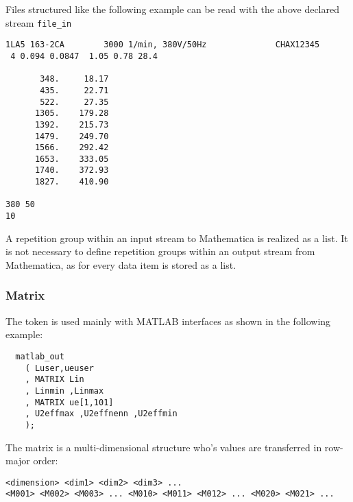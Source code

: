 Files structured like the following example can be read
with the above declared stream \verb+file_in+


\begin{boxedminipage}[t]{\linewidth}
\begin{verbatim}
1LA5 163-2CA        3000 1/min, 380V/50Hz              CHAX12345
 4 0.094 0.0847  1.05 0.78 28.4

       348.     18.17
       435.     22.71
       522.     27.35
      1305.    179.28
      1392.    215.73
      1479.    249.70
      1566.    292.42
      1653.    333.05
      1740.    372.93
      1827.    410.90

380 50
10
\end{verbatim}
\end{boxedminipage}


A repetition group within an input stream to Mathematica is realized as
a list. It is not necessary to define repetition groups within an output
stream from Mathematica, as for \INTENS{} every data item is stored
as a list.

\newpage
\subsubsection{Matrix}
\label{sec:stmatrix}

The \MATRIX{} token is used mainly with MATLAB
interfaces as shown in the following example:


\begin{boxedminipage}[t]{\linewidth}
\begin{verbatim}
  matlab_out
    ( Luser,ueuser
    , MATRIX Lin
    , Linmin ,Linmax
    , MATRIX ue[1,101]
    , U2effmax ,U2effnenn ,U2effmin
    );
\end{verbatim}
\end{boxedminipage}


The matrix is a multi-dimensional structure who's values are transferred in row-major order:


\begin{boxedminipage}[t]{\linewidth}
\begin{verbatim}
<dimension> <dim1> <dim2> <dim3> ...
<M001> <M002> <M003> ... <M010> <M011> <M012> ... <M020> <M021> ...
\end{verbatim}
\end{boxedminipage}


